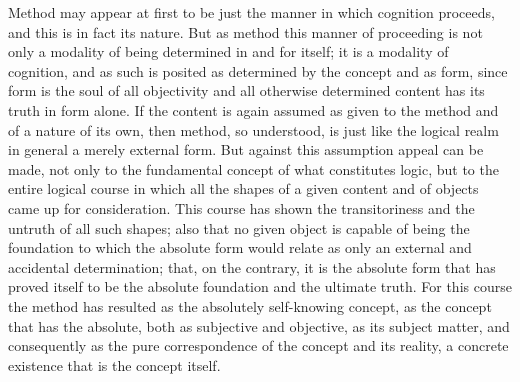 Method may appear at first to be just the manner
in which cognition proceeds, and this is in fact its nature.
But as method this manner of proceeding is not only a modality
of being determined in and for itself;
it is a modality of cognition,
and as such is posited as determined
by the concept and as form,
since form is the soul of all objectivity
and all otherwise determined content has its truth in form alone.
If the content is again assumed as given to the method
and of a nature of its own, then method,
so understood, is just like the logical realm in general
a merely external form.
But against this assumption appeal can be made, not only to the
fundamental concept of what constitutes logic, but to the entire logical
course in which all the shapes of a given content and of objects came up for
consideration.
This course has shown the transitoriness and the untruth of
all such shapes;
also that no given object is capable of being the foundation
to which the absolute form would relate as only an external and accidental
determination;
that, on the contrary, it is the absolute form
that has proved itself to be the absolute foundation
and the ultimate truth.
For this course the method has resulted as
the absolutely self-knowing concept,
as the concept that has the absolute,
both as subjective and objective,
as its subject matter,
and consequently as the pure correspondence
of the concept and its reality,
a concrete existence that is the concept itself.

